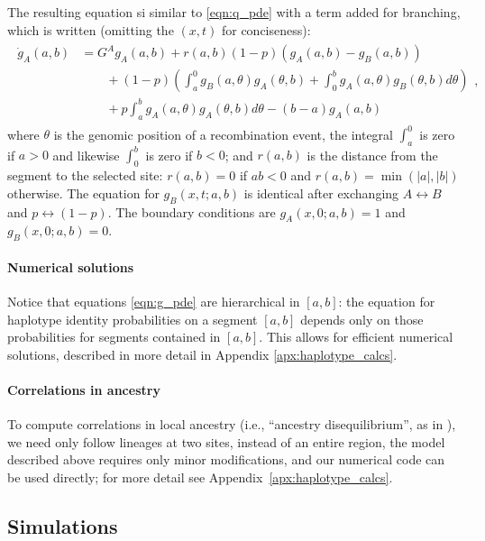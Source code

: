 \documentclass[11pt,letterpaper]{article}
\begin{document}
The resulting equation si similar to \eqref{eqn:q_pde} with a term added for branching,
which is written (omitting the $(x,t)$ for conciseness):
\begin{align}
    \begin{aligned} \label{eqn:g_pde}
        \dot g_A(a,b) 
        &= G^A g_A(a,b) + r(a,b) (1-p) (g_A(a,b)-g_B(a,b))
            \\ {} & \qquad 
            + (1-p) \left( \int_a^0 
                g_B(a,\theta) g_A(\theta,b)
                + \int_0^b g_A(a,\theta) g_B(\theta,b)
            d\theta \right)
            \\ {} & \qquad 
            + p \int_a^b {
                g_A(a,\theta) g_A(\theta,b) 
            } d\theta
            - (b-a) g_A(a,b)  
    \end{aligned} ,
\end{align}
where $\theta$ is the genomic position of a recombination event, 
the integral $\int_a^0$ is zero if $a>0$ and likewise $\int_0^b$ is zero if $b<0$;
and $r(a,b)$ is the distance from the segment to the selected site:
$r(a,b)=0$ if $ab<0$ and $r(a,b)=\min(|a|,|b|)$ otherwise.
The equation for $g_B(x,t;a,b)$ is identical after exchanging $A \leftrightarrow B$ and
$p \leftrightarrow (1-p)$.
The boundary conditions are $g_A(x,0;a,b)=1$ and $g_B(x,0;a,b)=0$.

\paragraph{Numerical solutions}
Notice that equations \eqref{eqn:g_pde}
are hierarchical in $[a,b]$:
the equation for haplotype identity probabilities on a segment $[a,b]$ depends only on those probabilities for segments contained in $[a,b]$.
This allows for efficient numerical solutions,
described in more detail in Appendix \ref{apx:haplotype_calcs}.


\paragraph{Correlations in ancestry}
To compute correlations in local ancestry
(i.e., ``ancestry disequilibrium'', as in \citet{Pool2015,Schumer2016}),
we need only follow lineages at two sites, instead of an entire region,
the model described above requires only minor modifications,
and our numerical code can be used directly;
for more detail see Appendix~\ref{apx:haplotype_calcs}.


\subsection*{Simulations}
\end{document}
